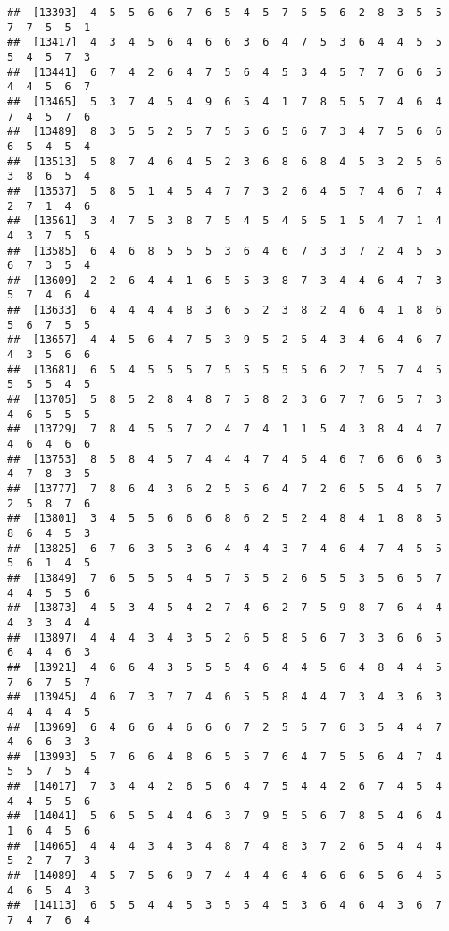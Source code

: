 \documentclass[
]{book}
\begin{document}
\begin{verbatim}
##  [13393]  4  5  5  6  6  7  6  5  4  5  7  5  5  6  2  8  3  5  5  7  7  5  5  1
##  [13417]  4  3  4  5  6  4  6  6  3  6  4  7  5  3  6  4  4  5  5  5  4  5  7  3
##  [13441]  6  7  4  2  6  4  7  5  6  4  5  3  4  5  7  7  6  6  5  4  4  5  6  7
##  [13465]  5  3  7  4  5  4  9  6  5  4  1  7  8  5  5  7  4  6  4  7  4  5  7  6
##  [13489]  8  3  5  5  2  5  7  5  5  6  5  6  7  3  4  7  5  6  6  6  5  4  5  4
##  [13513]  5  8  7  4  6  4  5  2  3  6  8  6  8  4  5  3  2  5  6  3  8  6  5  4
##  [13537]  5  8  5  1  4  5  4  7  7  3  2  6  4  5  7  4  6  7  4  2  7  1  4  6
##  [13561]  3  4  7  5  3  8  7  5  4  5  4  5  5  1  5  4  7  1  4  4  3  7  5  5
##  [13585]  6  4  6  8  5  5  5  3  6  4  6  7  3  3  7  2  4  5  5  6  7  3  5  4
##  [13609]  2  2  6  4  4  1  6  5  5  3  8  7  3  4  4  6  4  7  3  5  7  4  6  4
##  [13633]  6  4  4  4  4  8  3  6  5  2  3  8  2  4  6  4  1  8  6  5  6  7  5  5
##  [13657]  4  4  5  6  4  7  5  3  9  5  2  5  4  3  4  6  4  6  7  4  3  5  6  6
##  [13681]  6  5  4  5  5  5  7  5  5  5  5  5  6  2  7  5  7  4  5  5  5  5  4  5
##  [13705]  5  8  5  2  8  4  8  7  5  8  2  3  6  7  7  6  5  7  3  4  6  5  5  5
##  [13729]  7  8  4  5  5  7  2  4  7  4  1  1  5  4  3  8  4  4  7  4  6  4  6  6
##  [13753]  8  5  8  4  5  7  4  4  4  7  4  5  4  6  7  6  6  6  3  4  7  8  3  5
##  [13777]  7  8  6  4  3  6  2  5  5  6  4  7  2  6  5  5  4  5  7  2  5  8  7  6
##  [13801]  3  4  5  5  6  6  6  8  6  2  5  2  4  8  4  1  8  8  5  8  6  4  5  3
##  [13825]  6  7  6  3  5  3  6  4  4  4  3  7  4  6  4  7  4  5  5  5  6  1  4  5
##  [13849]  7  6  5  5  5  4  5  7  5  5  2  6  5  5  3  5  6  5  7  4  4  5  5  6
##  [13873]  4  5  3  4  5  4  2  7  4  6  2  7  5  9  8  7  6  4  4  4  3  3  4  4
##  [13897]  4  4  4  3  4  3  5  2  6  5  8  5  6  7  3  3  6  6  5  6  4  4  6  3
##  [13921]  4  6  6  4  3  5  5  5  4  6  4  4  5  6  4  8  4  4  5  7  6  7  5  7
##  [13945]  4  6  7  3  7  7  4  6  5  5  8  4  4  7  3  4  3  6  3  4  4  4  4  5
##  [13969]  6  4  6  6  4  6  6  6  7  2  5  5  7  6  3  5  4  4  7  4  6  6  3  3
##  [13993]  5  7  6  6  4  8  6  5  5  7  6  4  7  5  5  6  4  7  4  5  5  7  5  4
##  [14017]  7  3  4  4  2  6  5  6  4  7  5  4  4  2  6  7  4  5  4  4  4  5  5  6
##  [14041]  5  6  5  5  4  4  6  3  7  9  5  5  6  7  8  5  4  6  4  1  6  4  5  6
##  [14065]  4  4  4  3  4  3  4  8  7  4  8  3  7  2  6  5  4  4  4  5  2  7  7  3
##  [14089]  4  5  7  5  6  9  7  4  4  4  6  4  6  6  6  5  6  4  5  4  6  5  4  3
##  [14113]  6  5  5  4  4  5  3  5  5  4  5  3  6  4  6  4  3  6  7  7  4  7  6  4

\end{verbatim}
\end{document}
